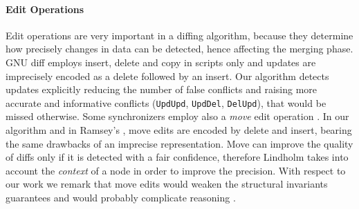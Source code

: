 \documentclass{sigplanconf}
\theoremstyle{plain}
\begin{document}
\paragraph{Edit Operations} 
Edit operations are very important in a diffing algorithm, because
they determine how precisely changes in data can be detected, 
hence affecting the merging phase.
%
GNU diff employs insert, delete and copy in scripts only and updates
are imprecisely encoded as a delete followed by an insert.  Our
algorithm detects updates explicitly reducing the number of false
conflicts and raising more accurate and informative conflicts
(\texttt{UpdUpd}, \texttt{UpdDel}, \texttt{DelUpd}), that would be
missed otherwise.
%
Some synchronizers employ also a \emph{move} edit operation
\cite{Lind04, Chawathe96, Chawathe97}.
In our algorithm and in Ramsey's \cite{Ramsey01}, move edits
are encoded by delete and insert, bearing the same 
drawbacks of an imprecise representation.
Move can improve the quality of diffs only if it is detected
with a fair confidence, therefore Lindholm takes into
account the \emph{context} of a node in order to improve the precision.
%
With respect to our work we remark that move edits would weaken 
the structural invariants guarantees and would probably 
complicate reasoning \cite{Ramsey01}.
	
\end{document}
